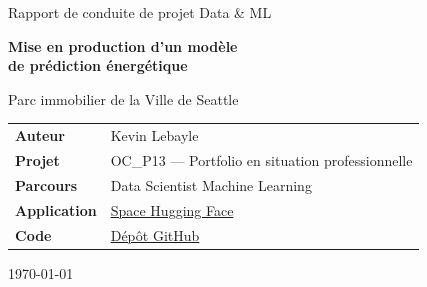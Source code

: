 \documentclass[11pt,a4paper]{article}
\begin{document}
\begin{titlepage}
\centering
\vspace*{2.5cm}

{\Large\color{gristexte}Rapport de conduite de projet Data \& ML\par}
\vspace{1.2cm}

{\Huge\bfseries Mise en production d'un modèle\\[0.3em]
de prédiction énergétique\par}
\vspace{0.9cm}

{\large\color{gristexte}Parc immobilier de la Ville de Seattle\par}
\vspace{2.5cm}

\begin{tabularx}{0.8\linewidth}{@{}l>{\raggedright\arraybackslash}X@{}}
\toprule
\textbf{Auteur} & Kevin Lebayle \\
\textbf{Projet} & OC\_P13 — Portfolio en situation professionnelle \\
\textbf{Parcours} & Data Scientist Machine Learning \\
\textbf{Application} & \href{https://huggingface.co/spaces/KLEB38/OC_P13_seattle_energy_emission_predictions}{Space Hugging Face} \\
\textbf{Code} & \href{https://github.com/KL38/OC_P13_ML_MLOPS_Building_Energy_model}{Dépôt GitHub} \\
\bottomrule
\end{tabularx}

\vfill
{\color{gristexte}\today\par}
\end{titlepage}

\tableofcontents
\newpage









\end{document}
